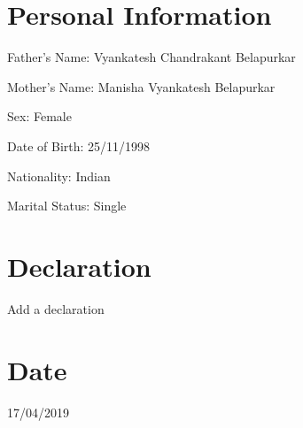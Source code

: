 \documentclass[margin]{res}
\begin{document}
\begin{resume}
\section{Personal Information}
Father's Name: Vyankatesh Chandrakant Belapurkar

Mother's Name: Manisha Vyankatesh Belapurkar

Sex: Female

Date of Birth: 25/11/1998

Nationality: Indian

Marital Status: Single

\section{Declaration}
Add a declaration

\section{Date}
17/04/2019

\end{resume}
\end{document}
